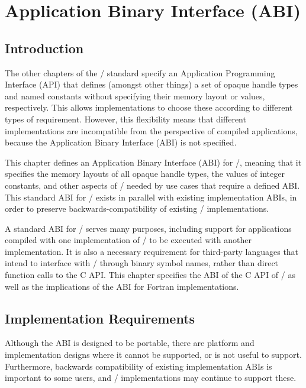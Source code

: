 \chapter{Application Binary Interface (ABI)}
\label{sec:abi}
\label{chap:abi}

\section{Introduction}
\label{sec:binary-interop}

The other chapters of the \MPI/ standard specify an Application Programming Interface (API) 
that defines (amongst other things) a set of opaque handle types and named constants without 
specifying their memory layout or values, respectively. 
This allows implementations to choose these according to different types of requirement. 
However, this flexibility means that different implementations are incompatible from 
the perspective of compiled applications, because the Application Binary Interface (ABI) 
is not specified.

This chapter defines an Application Binary Interface (ABI) for \MPI/,
meaning that it specifies the memory layouts of all opaque handle types, 
the values of integer constants, and other aspects of \MPI/ needed by use cases 
that require a defined ABI. 
This standard ABI for \MPI/ exists in parallel with existing implementation ABIs, 
in order to preserve backwards-compatibility of existing \MPI/ implementations.

A standard ABI for \MPI/ serves many purposes, including support for
applications compiled with one implementation of \MPI/ to be executed
with another implementation.
It is also a necessary requirement for third-party languages that intend
to interface with \MPI/ through binary symbol names, rather than direct
function calls to the C API. 
This chapter specifies the ABI of the C API of \MPI/
as well as the implications of the ABI for Fortran implementations.

\section{Implementation Requirements}

Although the ABI is designed to be portable,
there are platform and implementation designs where it cannot
be supported, or is not useful to support.
Furthermore, backwards compatibility of existing implementation
ABIs is important to some users, and \MPI/ implementations
may continue to support these.

